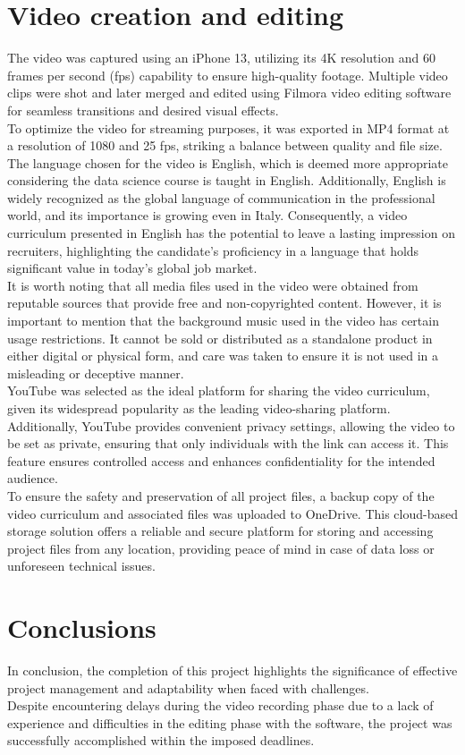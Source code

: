 \documentclass[eng]{class}
\begin{document}
\section{Video creation and editing}
The video was captured using an iPhone 13, utilizing its 4K resolution and 60 frames per second (fps) capability to ensure high-quality footage.
Multiple video clips were shot and later merged and edited using Filmora video editing software for seamless transitions and desired visual effects.\\
To optimize the video for streaming purposes, it was exported in MP4 format at a resolution of 1080 and 25 fps, striking a balance between quality and file size.\\
The language chosen for the video is English, which is deemed more appropriate considering the data science course is taught in English.
Additionally, English is widely recognized as the global language of communication in the professional world, and its importance is growing even in Italy.
Consequently, a video curriculum presented in English has the potential to leave a lasting impression on recruiters, highlighting the candidate's proficiency
in a language that holds significant value in today's global job market.\\
It is worth noting that all media files used in the video were obtained from reputable sources that provide free and non-copyrighted content.
However, it is important to mention that the background music used in the video has certain usage restrictions.
It cannot be sold or distributed as a standalone product in either digital or physical form, and care was taken to ensure
it is not used in a misleading or deceptive manner.\\
YouTube was selected as the ideal platform for sharing the video curriculum, given its widespread popularity as the leading video-sharing platform.
Additionally, YouTube provides convenient privacy settings, allowing the video to be set as private, ensuring that only individuals with the link can access it.
This feature ensures controlled access and enhances confidentiality for the intended audience.\\
To ensure the safety and preservation of all project files, a backup copy of the video curriculum and associated files was uploaded to OneDrive.
This cloud-based storage solution offers a reliable and secure platform for storing and accessing project files from any location,
providing peace of mind in case of data loss or unforeseen technical issues.\\
\section{Conclusions}
In conclusion, the completion of this project highlights
the significance of effective project management and adaptability when faced with challenges.\\
Despite encountering delays during the video recording phase due to a lack of experience and difficulties in the editing phase with the software,
the project was successfully accomplished within the imposed deadlines.
\end{document}

